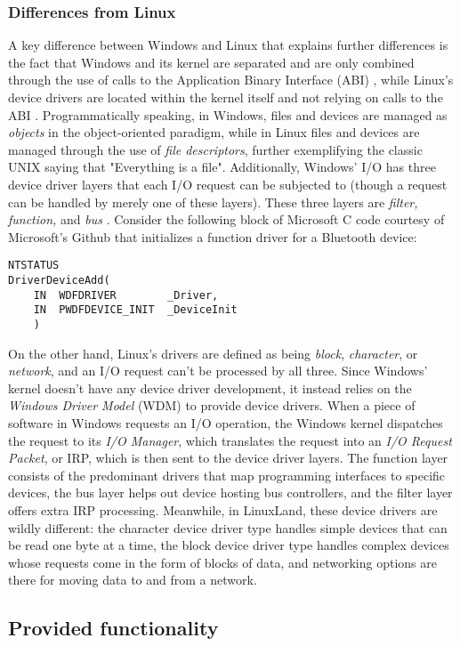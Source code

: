 \documentclass[letterpaper,10pt,titlepage]{article}
\begin{document}
\subsubsection{Differences from Linux}
A key difference between Windows and Linux that explains further differences is the fact that Windows and its kernel are separated and are only combined through the use of calls to the Application Binary Interface (ABI) \cite{windowsSys}, while Linux's device drivers are located within the kernel itself and not relying on calls to the ABI \cite{linux}. Programmatically speaking, in Windows, files and devices are managed as \emph{objects} in the object-oriented paradigm, while in Linux files and devices are managed through the use of \emph{file descriptors}, further exemplifying the classic UNIX saying that "Everything is a file". Additionally, Windows' I/O has three device driver layers that each I/O request can be subjected to (though a request can be handled by merely one of these layers). These three layers are \emph{filter, function,} and \emph{bus} \cite{windowsInt2}. Consider the following block of Microsoft C code courtesy of Microsoft's Github that initializes a function driver for a Bluetooth device:
\begin{lstlisting}
NTSTATUS
DriverDeviceAdd(
    IN  WDFDRIVER        _Driver,
    IN  PWDFDEVICE_INIT  _DeviceInit
    )
\end{lstlisting}
On the other hand, Linux's drivers are defined as being \emph{block}, \emph{character}, or \emph{network}, and an I/O request can't be processed by all three. Since Windows' kernel doesn't have any device driver development, it instead relies on the \emph{Windows Driver Model} (WDM) to provide device drivers. When a piece of software in Windows requests an I/O operation, the Windows kernel dispatches the request to its \emph{I/O Manager}, which translates the request into an \emph{I/O Request Packet}, or IRP, which is then sent to the device driver layers. The function layer consists of the predominant drivers that map programming interfaces to specific devices, the bus layer helps out device hosting bus controllers, and the filter layer offers extra IRP processing. Meanwhile, in LinuxLand, these device drivers are wildly different: the character device driver type handles simple devices that can be read one byte at a time, the block device driver type handles complex devices whose requests come in the form of blocks of data, and networking options are there for moving data to and from a network.         
\subsection{Provided functionality}
\end{document}

